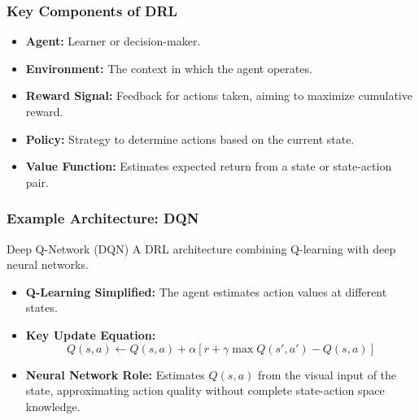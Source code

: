 \documentclass[aspectratio=169]{beamer}
\begin{document}
\begin{frame}[fragile]
    \frametitle{Key Components of DRL}
    \begin{itemize}
        \item \textbf{Agent:} Learner or decision-maker.
        \item \textbf{Environment:} The context in which the agent operates.
        \item \textbf{Reward Signal:} Feedback for actions taken, aiming to maximize cumulative reward.
        \item \textbf{Policy:} Strategy to determine actions based on the current state.
        \item \textbf{Value Function:} Estimates expected return from a state or state-action pair.
    \end{itemize}
\end{frame}

\begin{frame}[fragile]
    \frametitle{Example Architecture: DQN}
    \begin{block}{Deep Q-Network (DQN)}
        A DRL architecture combining Q-learning with deep neural networks.
    \end{block}

    \begin{itemize}
        \item \textbf{Q-Learning Simplified:} 
        The agent estimates action values at different states.
        \item \textbf{Key Update Equation:}
            \begin{equation}
                Q(s, a) \leftarrow Q(s, a) + \alpha \left[ r + \gamma \max Q(s', a') - Q(s, a) \right]
            \end{equation}
        
        \item \textbf{Neural Network Role:} 
        Estimates \(Q(s, a)\) from the visual input of the state, approximating action quality without complete state-action space knowledge.
    \end{itemize}
\end{frame}
\end{document}
